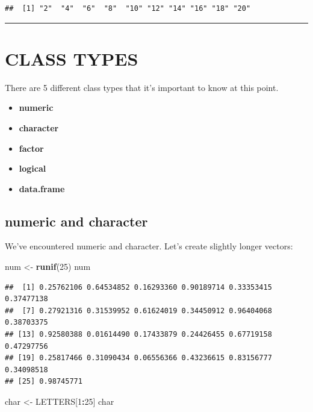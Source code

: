 \documentclass[
]{book}
\newenvironment{Shaded}{\begin{snugshade}}{\end{snugshade}}
\newcommand{\DecValTok}[1]{\textcolor[rgb]{0.00,0.00,0.81}{#1}}
\newcommand{\KeywordTok}[1]{\textcolor[rgb]{0.13,0.29,0.53}{\textbf{#1}}}
\newcommand{\NormalTok}[1]{#1}
\newcommand{\OperatorTok}[1]{\textcolor[rgb]{0.81,0.36,0.00}{\textbf{#1}}}
\newcommand{\StringTok}[1]{\textcolor[rgb]{0.31,0.60,0.02}{#1}}
\providecommand{\tightlist}{%
  \setlength{\itemsep}{0pt}\setlength{\parskip}{0pt}}
\begin{document}
\begin{verbatim}
##  [1] "2"  "4"  "6"  "8"  "10" "12" "14" "16" "18" "20"
\end{verbatim}

\begin{center}\rule{0.5\linewidth}{0.5pt}\end{center}

\hypertarget{class-types}{%
\section{CLASS TYPES}\label{class-types}}

There are 5 different class types that it's important to know at this point.

\begin{itemize}
\tightlist
\item
  \textbf{numeric}
\item
  \textbf{character}
\item
  \textbf{factor}
\item
  \textbf{logical}
\item
  \textbf{data.frame}
\end{itemize}

\hypertarget{numeric-and-character}{%
\subsection{numeric and character}\label{numeric-and-character}}

We've encountered numeric and character. Let's create slightly longer vectors:

\begin{Shaded}
\begin{Highlighting}[]
\NormalTok{num <-}\StringTok{ }\KeywordTok{runif}\NormalTok{(}\DecValTok{25}\NormalTok{)}
\NormalTok{num}
\end{Highlighting}
\end{Shaded}

\begin{verbatim}
##  [1] 0.25762106 0.64534852 0.16293360 0.90189714 0.33353415 0.37477138
##  [7] 0.27921316 0.31539952 0.61624019 0.34450912 0.96404068 0.38703375
## [13] 0.92580388 0.01614490 0.17433879 0.24426455 0.67719158 0.47297756
## [19] 0.25817466 0.31090434 0.06556366 0.43236615 0.83156777 0.34098518
## [25] 0.98745771
\end{verbatim}

\begin{Shaded}
\begin{Highlighting}[]
\NormalTok{char <-}\StringTok{ }\NormalTok{LETTERS[}\DecValTok{1}\OperatorTok{:}\DecValTok{25}\NormalTok{]}
\NormalTok{char}
\end{Highlighting}
\end{Shaded}
\end{document}
